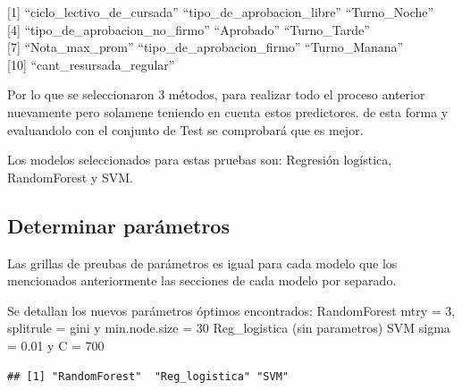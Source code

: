 \documentclass[]{article}
\begin{document}
{[}1{]} ``ciclo\_lectivo\_de\_cursada'' ``tipo\_de\_aprobacion\_libre''
``Turno\_Noche''\\
{[}4{]} ``tipo\_de\_aprobacion\_no\_firmo'' ``Aprobado''
``Turno\_Tarde''\\
{[}7{]} ``Nota\_max\_prom'' ``tipo\_de\_aprobacion\_firmo''
``Turno\_Manana''\\
{[}10{]} ``cant\_resursada\_regular''

Por lo que se seleccionaron 3 métodos, para realizar todo el proceso
anterior nuevamente pero solamene teniendo en cuenta estos predictores.
de esta forma y evaluandolo con el conjunto de Test se comprobará que es
mejor.

Los modelos seleccionados para estas pruebas son: Regresión logística,
RandomForest y SVM.

\hypertarget{determinar-paruxe1metros-1}{%
\subsection{Determinar parámetros}\label{determinar-paruxe1metros-1}}

Las grillas de preubas de parámetros es igual para cada modelo que los
mencionados anteriormente las secciones de cada modelo por separado.

Se detallan los nuevos parámetros óptimos encontrados: RandomForest mtry
= 3, splitrule = gini y min.node.size = 30 Reg\_logistica (sin
parametros) SVM sigma = 0.01 y C = 700

\begin{lstlisting}
## [1] "RandomForest"  "Reg_logistica" "SVM"
\end{lstlisting}
\end{document}
